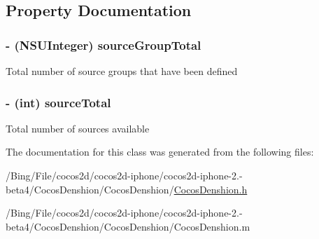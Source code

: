 \subsection{Property Documentation}
\hypertarget{interface_c_d_sound_engine_a2e416630cc0722eac6ba889dcb9461ba}{
\subsubsection[{source\-Group\-Total}]{\setlength{\rightskip}{0pt plus 5cm}-\/ (N\-S\-U\-Integer) {\bf source\-Group\-Total}}}\label{interface_c_d_sound_engine_a2e416630cc0722eac6ba889dcb9461ba}
Total number of source groups that have been defined \hypertarget{interface_c_d_sound_engine_a951c8a98f46192e4ed56ebe41f7abe59}{
\subsubsection[{source\-Total}]{\setlength{\rightskip}{0pt plus 5cm}-\/ (int) {\bf source\-Total}}}\label{interface_c_d_sound_engine_a951c8a98f46192e4ed56ebe41f7abe59}
Total number of sources available 

The documentation for this class was generated from the following files\-:\begin{DoxyCompactItemize}
\item 
/\-Bing/\-File/cocos2d/cocos2d-\/iphone/cocos2d-\/iphone-\/2.-\/beta4/\-Cocos\-Denshion/\-Cocos\-Denshion/\hyperlink{_cocos_denshion_8h}{Cocos\-Denshion.\-h}\item 
/\-Bing/\-File/cocos2d/cocos2d-\/iphone/cocos2d-\/iphone-\/2.-\/beta4/\-Cocos\-Denshion/\-Cocos\-Denshion/Cocos\-Denshion.\-m\end{DoxyCompactItemize}
